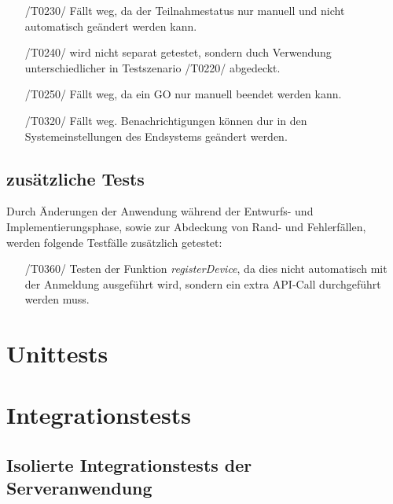 \documentclass[11pt,a4paper]{scrartcl}
\begin{document}
\begin{itemize}
	\item[/T0230/] Fällt weg, da der Teilnahmestatus nur manuell und nicht automatisch geändert werden kann.
	
	\item[/T0240/] wird nicht separat getestet, sondern duch Verwendung unterschiedlicher in Testszenario /T0220/ abgedeckt.
	
	\item[/T0250/] Fällt weg, da ein GO nur manuell beendet werden kann.
	
	\item[/T0320/] Fällt weg. Benachrichtigungen können dur in den Systemeinstellungen des Endsystems geändert werden.
	
\end{itemize}

\subsection{zusätzliche Tests}
Durch Änderungen der Anwendung während der Entwurfs- und Implementierungsphase, sowie zur Abdeckung von Rand- und Fehlerfällen, werden folgende Testfälle zusätzlich getestet:
\begin{itemize}
	\item[/T0360/]\label{360} Testen der Funktion \textit{registerDevice}, da dies nicht automatisch mit der Anmeldung ausgeführt wird, sondern ein extra API-Call durchgeführt werden muss.
\end{itemize}

\newpage

\section{Unittests}

\newpage

\section{Integrationstests}
\subsection{Isolierte Integrationstests der Serveranwendung}\label{ServerIT}
\end{document}
